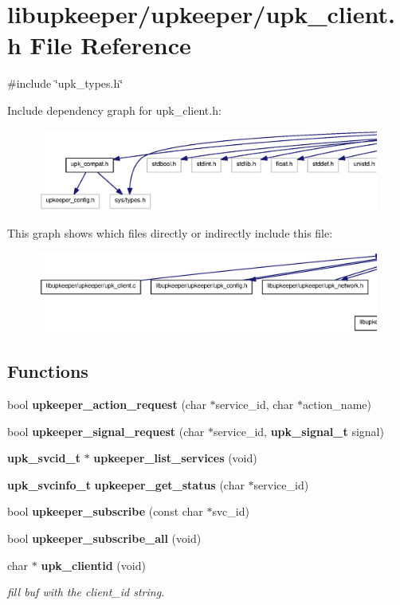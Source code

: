 \section{libupkeeper/upkeeper/upk\_\-client.h File Reference}
\label{upk__client_8h}
{\ttfamily \#include \char`\"{}upk\_\-types.h\char`\"{}}\par
Include dependency graph for upk\_\-client.h:\nopagebreak
\begin{figure}[H]
\begin{center}
\leavevmode
\includegraphics[width=400pt]{upk__client_8h__incl}
\end{center}
\end{figure}
This graph shows which files directly or indirectly include this file:
\nopagebreak
\begin{figure}[H]
\begin{center}
\leavevmode
\includegraphics[width=400pt]{upk__client_8h__dep__incl}
\end{center}
\end{figure}
\subsection*{Functions}
\begin{DoxyCompactItemize}
\item 
bool {\bf upkeeper\_\-action\_\-request} (char $\ast$service\_\-id, char $\ast$action\_\-name)
\item 
bool {\bf upkeeper\_\-signal\_\-request} (char $\ast$service\_\-id, {\bf upk\_\-signal\_\-t} signal)
\item 
{\bf upk\_\-svcid\_\-t} $\ast$ {\bf upkeeper\_\-list\_\-services} (void)
\item 
{\bf upk\_\-svcinfo\_\-t} {\bf upkeeper\_\-get\_\-status} (char $\ast$service\_\-id)
\item 
bool {\bf upkeeper\_\-subscribe} (const char $\ast$svc\_\-id)
\item 
bool {\bf upkeeper\_\-subscribe\_\-all} (void)
\item 
char $\ast$ {\bf upk\_\-clientid} (void)
\begin{DoxyCompactList}\small\item\em fill buf with the client\_\-id string. \end{DoxyCompactList}\end{DoxyCompactItemize}


